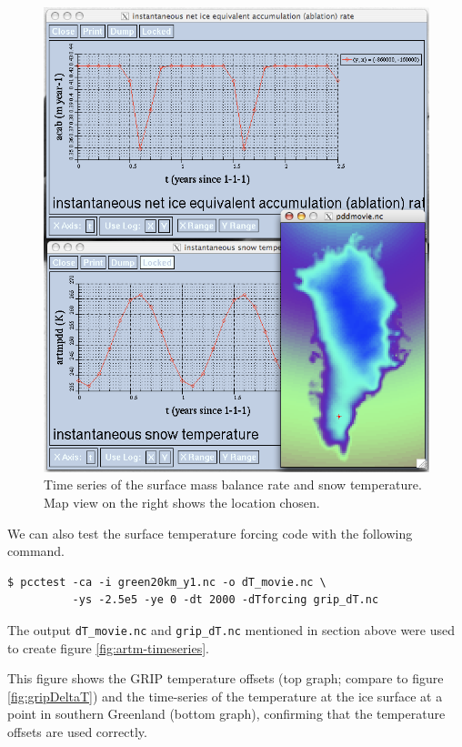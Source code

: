 \documentclass[11pt,final]{amsart}
\begin{document}
\begin{figure}[ht]
  \centering
  \includegraphics[width=5in]{figs/pdd_timeseries}
  \caption{Time series of the surface mass balance rate and snow temperature. Map view 
           on the right shows the location chosen.}
  \label{fig:pddseries}
\end{figure}

\bigskip
We can also test the surface temperature forcing code with the following command.
\begin{verbatim}
$ pcctest -ca -i green20km_y1.nc -o dT_movie.nc \
          -ys -2.5e5 -ye 0 -dt 2000 -dTforcing grip_dT.nc
\end{verbatim}
The output \verb|dT_movie.nc| and \verb|grip_dT.nc| mentioned in section above were used to create figure \ref{fig:artm-timeseries}.

This figure shows the GRIP temperature offsets (top graph; compare to figure \ref{fig:gripDeltaT}) and the time-series of the temperature at the ice surface at a point in southern Greenland (bottom graph), confirming that the temperature offsets are used correctly.
\end{document}
